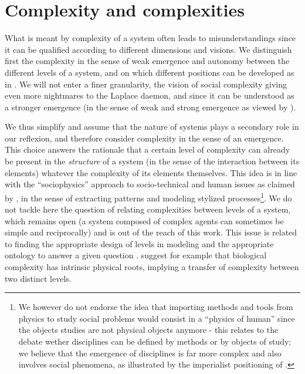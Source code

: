 \section{Complexity and complexities}


What is meant by complexity of a system often leads to misunderstandings since it can be qualified according to different dimensions and visions. We distinguish first the complexity in the sense of weak emergence and autonomy between the different levels of a system, and on which different positions can be developed as in \cite{deffuant2015visions}. We will not enter a finer granularity, the vision of social complexity giving even more nightmares to the Laplace daemon, and since it can be understood as a stronger emergence (in the sense of weak and strong emergence as viewed by \cite{bedau2002downward}).


We thus simplify and assume that the nature of systems plays a secondary role in our reflexion, and therefore consider complexity in the sense of an emergence. This choice answers the rationale that a certain level of complexity can already be present in the \emph{structure} of a system (in the sense of the interaction between its elements) whatever the complexity of its elements themselves. This idea is in line with the ``sociophysics'' approach to socio-technical and human issues as claimed by \cite{caldarelli2018physics}, in the sense of extracting patterns and modeling stylized processes\footnote{We however do not endorse the idea that importing methods and tools from physics to study social problems would consist in a ``physics of human'' since the objects studies are not physical objects anymore - this relates to the debate wether disciplines can be defined by methods or by objects of study; we believe that the emergence of disciplines is far more complex and also involves social phenomena, as illustrated by the imperialist positioning of \cite{caldarelli2018physics}.}. We do not tackle here the question of relating complexities between levels of a system, which remains open (a system composed of complex agents can sometimes be simple and reciprocally) and is out of the reach of this work. This issue is related to finding the appropriate design of levels in modeling and the appropriate ontology to answer a given question \cite{roth2009reconstruction}. \cite{WolfE8678} suggest for example that biological complexity has intrinsic physical roots, implying a transfer of complexity between two distinct levels.

